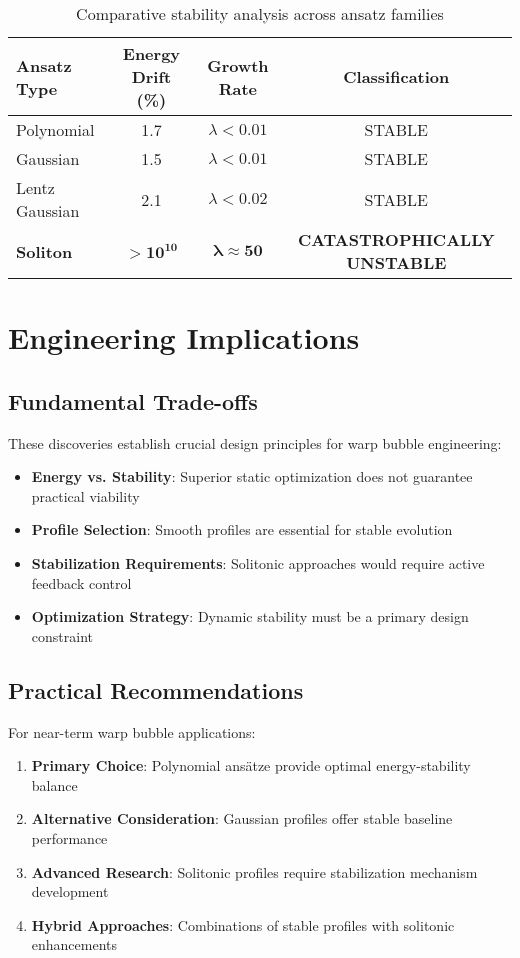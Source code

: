 \documentclass[12pt,a4paper]{article}
\begin{document}
\begin{table}[h]
\centering
\begin{tabular}{@{}lccc@{}}
\toprule
Ansatz Type & Energy Drift (\%) & Growth Rate & Classification \\
\midrule
Polynomial & 1.7 & $\lambda < 0.01$ & STABLE \\
Gaussian & 1.5 & $\lambda < 0.01$ & STABLE \\
Lentz Gaussian & 2.1 & $\lambda < 0.02$ & STABLE \\
\textbf{Soliton} & $\mathbf{> 10^{10}}$ & $\boldsymbol{\lambda \approx 50}$ & \textbf{CATASTROPHICALLY UNSTABLE} \\
\bottomrule
\end{tabular}
\caption{Comparative stability analysis across ansatz families}
\end{table}

\section{Engineering Implications}

\subsection{Fundamental Trade-offs}

These discoveries establish crucial design principles for warp bubble engineering:

\begin{itemize}
\item \textbf{Energy vs. Stability}: Superior static optimization does not guarantee practical viability
\item \textbf{Profile Selection}: Smooth profiles are essential for stable evolution
\item \textbf{Stabilization Requirements}: Solitonic approaches would require active feedback control
\item \textbf{Optimization Strategy}: Dynamic stability must be a primary design constraint
\end{itemize}

\subsection{Practical Recommendations}

For near-term warp bubble applications:

\begin{enumerate}
\item \textbf{Primary Choice}: Polynomial ansätze provide optimal energy-stability balance
\item \textbf{Alternative Consideration}: Gaussian profiles offer stable baseline performance
\item \textbf{Advanced Research}: Solitonic profiles require stabilization mechanism development
\item \textbf{Hybrid Approaches}: Combinations of stable profiles with solitonic enhancements
\end{enumerate}
\end{document}
